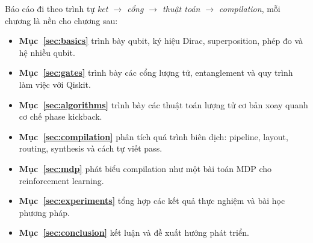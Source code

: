 Báo cáo đi theo trình tự \emph{ket $\to$ cổng $\to$ thuật toán $\to$ compilation}, mỗi chương là nền
cho chương sau:
\begin{itemize}[noitemsep]
  \item \textbf{Mục~\ref{sec:basics}} trình bày qubit, ký hiệu Dirac, superposition, phép đo và hệ
    nhiều qubit.
  \item \textbf{Mục~\ref{sec:gates}} trình bày các cổng lượng tử, entanglement và quy trình làm việc
    với Qiskit.
  \item \textbf{Mục~\ref{sec:algorithms}} trình bày các thuật toán lượng tử cơ bản xoay quanh cơ chế
    phase kickback.
  \item \textbf{Mục~\ref{sec:compilation}} phân tích quá trình biên dịch: pipeline, layout, routing,
    synthesis và cách tự viết pass.
  \item \textbf{Mục~\ref{sec:mdp}} phát biểu compilation như một bài toán MDP cho reinforcement
    learning.
  \item \textbf{Mục~\ref{sec:experiments}} tổng hợp các kết quả thực nghiệm và bài học phương pháp.
  \item \textbf{Mục~\ref{sec:conclusion}} kết luận và đề xuất hướng phát triển.
\end{itemize}
